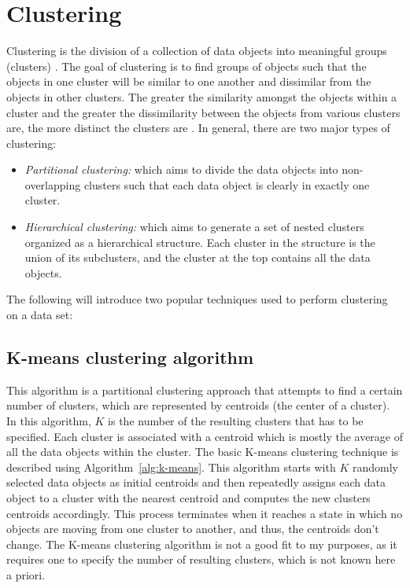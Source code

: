 \section{Clustering}  \label{ch3-clustering}
Clustering is the division of a collection of data objects into meaningful groups (clusters) \cite{jain1999data}. The goal of clustering is to find groups of objects such that the objects in one cluster will be similar to one another and dissimilar from the objects in other clusters. The greater the similarity amongst the objects within a cluster and the greater the dissimilarity between the objects from various clusters are, the more distinct the clusters are \cite{tan2013data}.  In general, there are two major types of clustering:

\begin{itemize} [leftmargin=.4in]
\item \emph{Partitional clustering:} which aims to divide the data objects into non-overlapping clusters such that each data object is clearly in exactly one cluster.
\item \emph{Hierarchical clustering:} which aims to generate a set of nested clusters organized as a hierarchical structure. Each cluster in the structure is the union of its subclusters, and the cluster at the top contains all the data objects.
\end{itemize}

The following will introduce two popular techniques used to perform clustering on a data set:

\subsection{K-means clustering algorithm}
This algorithm is a partitional clustering approach that attempts to find a certain number of clusters, which are represented by centroids (the center of a cluster). In this algorithm, ${K}$ is the number of the resulting clusters that has to be specified. Each cluster is associated with a centroid which is mostly the average of all the
data objects within the cluster. The basic K-means clustering technique is described using Algorithm~\ref{alg:k-means}. This algorithm starts with $K$ randomly selected data objects as initial centroids and then repeatedly assigns each data object to a cluster with the nearest centroid and computes the new clusters centroids accordingly. This process terminates when it reaches a state in which no objects are moving from one cluster to another, and thus, the centroids don't change.
The K-means clustering algorithm is not a good fit to my purposes, as it requires one to specify the number of resulting clusters, which is not known here a priori. %

